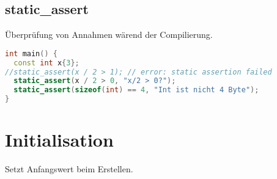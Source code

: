 \documentclass[10pt,twocolumn]{scrartcl}
\begin{document}
\subsection{static\_assert}

Überprüfung von Annahmen wärend der Compilierung.

\begin{lstlisting}[language=C++]
int main() {
  const int x{3};
//static_assert(x / 2 > 1); // error: static assertion failed
  static_assert(x / 2 > 0, "x/2 > 0?");
  static_assert(sizeof(int) == 4, "Int ist nicht 4 Byte");
}
\end{lstlisting}


\section{Initialisation}

Setzt Anfangswert beim Erstellen.
\end{document}
